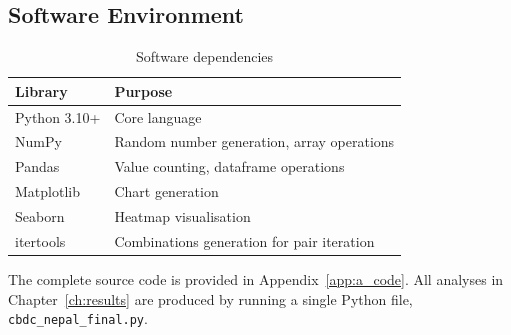 \subsection{Software Environment}

\begin{table}[H]
\centering
\caption{Software dependencies}
\label{tab:software}
\begin{tabular}{ll}
\toprule
\textbf{Library} & \textbf{Purpose}\\
\midrule
Python 3.10+  & Core language\\
NumPy         & Random number generation, array operations\\
Pandas        & Value counting, dataframe operations\\
Matplotlib    & Chart generation\\
Seaborn       & Heatmap visualisation\\
itertools     & Combinations generation for pair iteration\\
\bottomrule
\end{tabular}
\end{table}

The complete source code is provided in
Appendix~\ref{app:a_code}. All analyses in
Chapter~\ref{ch:results} are produced by running a single
Python file, \texttt{cbdc\_nepal\_final.py}.